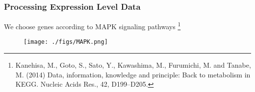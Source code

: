 \begin{frame}
    \frametitle{Processing Expression Level Data}

    We choose genes according to MAPK signaling pathways \footnote[2]{Kanehisa, M., Goto, S., Sato, Y., Kawashima, M., Furumichi, M. and Tanabe, M. (2014) Data, information, knowledge and principle: Back to metabolism in KEGG. Nucleic Acids Res., 42, D199–D205.}

    \begin{figure}[h]
        \centering
        \texttt{[image: ./figs/MAPK.png]}
    \end{figure}
\end{frame}